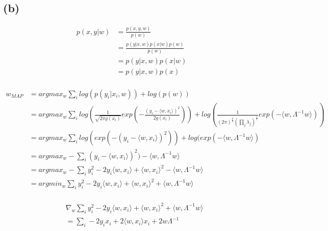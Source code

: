\documentclass[a4paper]{scrartcl}
\begin{document}
  \subsection*{(b)}
    \begin{align*}
      p(x, y \vert w)
      &= \frac{p(x,y,w)}{p(w)}\\
      &= \frac{p(y\vert x, w) p(x \vert w) p (w) }{p(w)}\\
      &= p(y\vert x, w) p(x \vert w)\\
      &= p(y\vert x, w) p(x)\\
    \end{align*}

    \begin{align*}
      w_{MAP}
      &= argmax_w \sum_i log(p(y_i \vert x_i, w)) + log(p(w))\\
      &= argmax_w \sum_i log(\frac{1}{\sqrt{2 \pi g(x_i)}} exp(-\frac{(y_i-\langle w, x_i \rangle )^2}{2g(x_i)})) + log(\frac{1}{(2\pi)^\frac{d}{2} (\prod_j \lambda_j)^\frac{1}{2}} exp(- \langle w, \Lambda^{-1}w \rangle))\\
      &= argmax_w \sum_i log(exp(-(y_i-\langle w, x_i \rangle )^2)) + log(exp(- \langle w, \Lambda^{-1}w \rangle)\\
      &= argmax_w - \sum_i(y_i-\langle w, x_i \rangle )^2) - \langle w, \Lambda^{-1}w \rangle\\
      &= argmax_w - \sum_i y_i^2 -2y_i \langle w, x_i \rangle + \langle w, x_i \rangle^2 - \langle w, \Lambda^{-1}w \rangle\\
      &= argmin_w  \sum_i y_i^2 -2y_i \langle w, x_i \rangle + \langle w, x_i \rangle^2 + \langle w, \Lambda^{-1}w \rangle\\
    \end{align*}

    \begin{align*}
      & \nabla_w \sum_i y_i^2 -2y_i \langle w, x_i \rangle + \langle w, x_i \rangle^2 + \langle w, \Lambda^{-1}w \rangle\\
      &= \sum_i -2y_i x_i + 2 \langle w,  x_i \rangle x_i + 2 w \Lambda^{-1}
    \end{align*}

\end{document}
